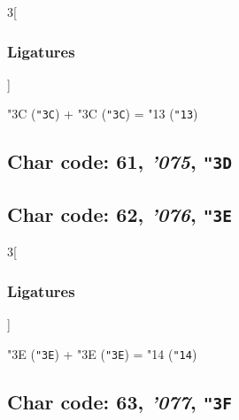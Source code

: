 \documentclass{article}
\newlength{\maxcharwidth}
\begin{document}
\begin{multicols}{3}[\subsubsection{Ligatures}]

{\testfont\char"3C\noboundary} ({\tt"3C}) + {\testfont\char"3C\noboundary} ({\tt"3C}) = {\testfont\char"13\noboundary} ({\tt"13}) 

\end{multicols}

\subsection{Char code: 61, {\it'075}, {\tt"3D}}
\label{char_61}


\subsection{Char code: 62, {\it'076}, {\tt"3E}}
\label{char_62}


\begin{multicols}{3}[\subsubsection{Ligatures}]

{\testfont\char"3E\noboundary} ({\tt"3E}) + {\testfont\char"3E\noboundary} ({\tt"3E}) = {\testfont\char"14\noboundary} ({\tt"14}) 

\end{multicols}

\subsection{Char code: 63, {\it'077}, {\tt"3F}}
\label{char_63}
\end{document}
